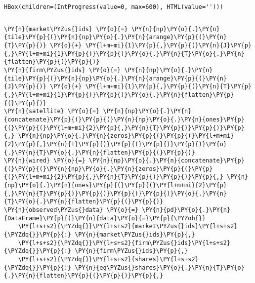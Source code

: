    \begin{verbatim}
HBox(children=(IntProgress(value=0, max=600), HTML(value='')))
    \end{verbatim}


    \begin{Verbatim}[commandchars=\\\{\}]

    \end{Verbatim}

    \begin{tcolorbox}[breakable, size=fbox, boxrule=1pt, pad at break*=1mm,colback=cellbackground, colframe=cellborder]
\begin{Verbatim}[commandchars=\\\{\}]
\PY{n}{market\PYZus{}ids} \PY{o}{=} \PY{n}{np}\PY{o}{.}\PY{n}{tile}\PY{p}{(}\PY{n}{np}\PY{o}{.}\PY{n}{arange}\PY{p}{(}\PY{n}{T}\PY{p}{)} \PY{o}{+} \PY{l+m+mi}{1}\PY{p}{,}\PY{p}{(}\PY{n}{J}\PY{p}{,}\PY{l+m+mi}{1}\PY{p}{)}\PY{p}{)}\PY{o}{.}\PY{n}{T}\PY{o}{.}\PY{n}{flatten}\PY{p}{(}\PY{p}{)}
\PY{n}{firm\PYZus{}ids} \PY{o}{=} \PY{n}{np}\PY{o}{.}\PY{n}{tile}\PY{p}{(}\PY{n}{np}\PY{o}{.}\PY{n}{arange}\PY{p}{(}\PY{n}{J}\PY{p}{)} \PY{o}{+} \PY{l+m+mi}{1}\PY{p}{,}\PY{p}{(}\PY{n}{T}\PY{p}{,}\PY{l+m+mi}{1}\PY{p}{)}\PY{p}{)}\PY{o}{.}\PY{n}{flatten}\PY{p}{(}\PY{p}{)}
\PY{n}{satellite} \PY{o}{=} \PY{n}{np}\PY{o}{.}\PY{n}{concatenate}\PY{p}{(}\PY{p}{(}\PY{n}{np}\PY{o}{.}\PY{n}{ones}\PY{p}{(}\PY{p}{(}\PY{l+m+mi}{2}\PY{p}{,}\PY{n}{T}\PY{p}{)}\PY{p}{)}\PY{p}{,} \PY{n}{np}\PY{o}{.}\PY{n}{zeros}\PY{p}{(}\PY{p}{(}\PY{l+m+mi}{2}\PY{p}{,}\PY{n}{T}\PY{p}{)}\PY{p}{)}\PY{p}{)}\PY{p}{)}\PY{o}{.}\PY{n}{T}\PY{o}{.}\PY{n}{flatten}\PY{p}{(}\PY{p}{)}
\PY{n}{wired} \PY{o}{=} \PY{n}{np}\PY{o}{.}\PY{n}{concatenate}\PY{p}{(}\PY{p}{(}\PY{n}{np}\PY{o}{.}\PY{n}{zeros}\PY{p}{(}\PY{p}{(}\PY{l+m+mi}{2}\PY{p}{,}\PY{n}{T}\PY{p}{)}\PY{p}{)}\PY{p}{,} \PY{n}{np}\PY{o}{.}\PY{n}{ones}\PY{p}{(}\PY{p}{(}\PY{l+m+mi}{2}\PY{p}{,}\PY{n}{T}\PY{p}{)}\PY{p}{)}\PY{p}{)}\PY{p}{)}\PY{o}{.}\PY{n}{T}\PY{o}{.}\PY{n}{flatten}\PY{p}{(}\PY{p}{)}
\PY{n}{observed\PYZus{}data} \PY{o}{=} \PY{n}{pd}\PY{o}{.}\PY{n}{DataFrame}\PY{p}{(}\PY{n}{data}\PY{o}{=}\PY{p}{\PYZob{}}
    \PY{l+s+s2}{\PYZdq{}}\PY{l+s+s2}{market\PYZus{}ids}\PY{l+s+s2}{\PYZdq{}}\PY{p}{:} \PY{n}{market\PYZus{}ids}\PY{p}{,}
    \PY{l+s+s2}{\PYZdq{}}\PY{l+s+s2}{firm\PYZus{}ids}\PY{l+s+s2}{\PYZdq{}}\PY{p}{:} \PY{n}{firm\PYZus{}ids}\PY{p}{,}
    \PY{l+s+s2}{\PYZdq{}}\PY{l+s+s2}{shares}\PY{l+s+s2}{\PYZdq{}}\PY{p}{:} \PY{n}{eq\PYZus{}shares}\PY{o}{.}\PY{n}{T}\PY{o}{.}\PY{n}{flatten}\PY{p}{(}\PY{p}{)}\PY{p}{,}

\end{Verbatim}
\end{tcolorbox}
